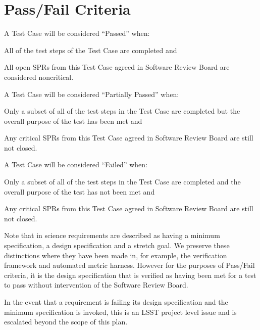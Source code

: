 
\section{Pass/Fail Criteria}


A Test Case will be considered ``Passed'' when:
\begin{itemize_single}
\item All of the test steps of the Test Case are completed and
\item All open SPRs from this Test Case agreed in Software Review Board are considered noncritical.
\end{itemize_single}

A Test Case will be considered ``Partially Passed'' when:
\begin{itemize_single}
\item Only a subset of all of the test steps in the Test Case are completed but the overall purpose of the test has been met and
\item Any critical SPRs from this Test Case agreed in Software Review Board are still not closed.
\end{itemize_single}

A Test Case will be considered ``Failed'' when:
\begin{itemize_single}
\item Only a subset of all of the test steps in the Test Case are completed and the overall purpose of the test has not been met and
\item Any critical SPRs from this Test Case agreed in Software Review Board are still not closed.
\end{itemize_single}

Note that in  science requirements are described as having a minimum specification, a design specification and a stretch goal. We preserve these distinctions where they have been made in, for example, the verification framework and automated metric harness. However for the purposes of Pass/Fail criteria, it is the design specification that is verified as having been met for a test to pass without intervention of the Software Review Board.

In the event that a requirement is failing its design specification and the minimum specification is invoked, this is an LSST project level issue and is escalated beyond the scope of this plan. 
